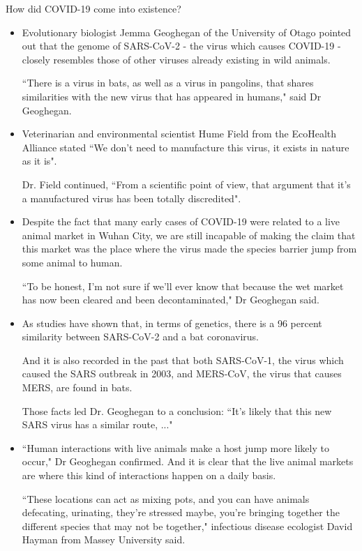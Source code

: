    \par How did COVID-19 come into existence? \parencite{CoronavirusOrigin}
      \begin{itemize}
        \item Evolutionary biologist Jemma Geoghegan of the University of Otago pointed out that the genome of SARS-CoV-2 - the virus which causes COVID-19 - closely resembles those of other viruses already existing in wild animals. 
        \par ``There is a virus in bats, as well as a virus in pangolins, that shares similarities with the new virus that has appeared in humans," said Dr Geoghegan.
        \item Veterinarian and environmental scientist Hume Field from the EcoHealth Alliance stated ``We don't need to manufacture this virus, it exists in nature as it is". 
        \par Dr. Field continued, ``From a scientific point of view, that argument that it's a manufactured virus has been totally discredited".
        \item Despite the fact that many early cases of COVID-19 were related to a live animal market in Wuhan City, we are still incapable of making the claim that this market was the place where the virus made the species barrier jump from some animal to human. 
        \par ``To be honest, I'm not sure if we'll ever know that because the wet market has now been cleared and been decontaminated," Dr Geoghegan said.
        \item As studies have shown that, in terms of genetics, there is a 96 percent similarity between SARS-CoV-2 and a bat coronavirus.
        \par And it is also recorded in the past that both SARS-CoV-1, the virus which caused the SARS outbreak in 2003, and MERS‐CoV, the virus that causes MERS, are found in bats. 
        \par Those facts led Dr. Geoghegan to a conclusion: ``It's likely that this new SARS virus has a similar route, ..."
        \item ``Human interactions with live animals make a host jump more likely to occur," Dr Geoghegan confirmed. And it is clear that the live animal markets are where this kind of interactions happen on a daily basis. 
        \par ``These locations can act as mixing pots, and you can have animals defecating, urinating, they're stressed maybe, you're bringing together the different species that may not be together," infectious disease ecologist David Hayman from Massey University said.

\end{itemize}
